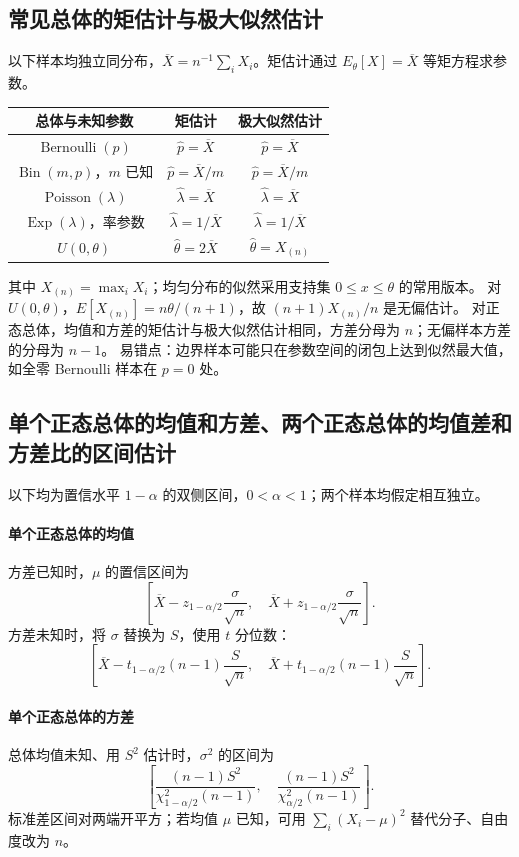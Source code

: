 \documentclass[../main.tex]{subfiles}
\begin{document}
\subsection{常见总体的矩估计与极大似然估计}
以下样本均独立同分布，$\overline X=n^{-1}\sum_iX_i$。矩估计通过 $E_\theta[X]=\overline X$ 等矩方程求参数。
\begin{center}
\begin{tabular}{c|c|c}
总体与未知参数 & 矩估计 & 极大似然估计\\\hline
$\operatorname{Bernoulli}(p)$ & $\widehat p=\overline X$ & $\widehat p=\overline X$\\
$\operatorname{Bin}(m,p)$，$m$ 已知 & $\widehat p=\overline X/m$ & $\widehat p=\overline X/m$\\
$\operatorname{Poisson}(\lambda)$ & $\widehat\lambda=\overline X$ & $\widehat\lambda=\overline X$\\
$\operatorname{Exp}(\lambda)$，率参数 & $\widehat\lambda=1/\overline X$ & $\widehat\lambda=1/\overline X$\\
$U(0,\theta)$ & $\widehat\theta=2\overline X$ & $\widehat\theta=X_{(n)}$
\end{tabular}
\end{center}
其中 $X_{(n)}=\max_iX_i$；均匀分布的似然采用支持集 $0\le x\le\theta$ 的常用版本。
对 $U(0,\theta)$，$E[X_{(n)}]=n\theta/(n+1)$，故 $(n+1)X_{(n)}/n$ 是无偏估计。
对正态总体，均值和方差的矩估计与极大似然估计相同，方差分母为 $n$；无偏样本方差的分母为 $n-1$。
易错点：边界样本可能只在参数空间的闭包上达到似然最大值，如全零 Bernoulli 样本在 $p=0$ 处。
\subsection{单个正态总体的均值和方差、两个正态总体的均值差和方差比的区间估计}
以下均为置信水平 $1-\alpha$ 的双侧区间，$0<\alpha<1$；两个样本均假定相互独立。

\paragraph{单个正态总体的均值}
方差已知时，$\mu$ 的置信区间为
\[
\left[\overline X-z_{1-\alpha/2}\frac\sigma{\sqrt n},\quad
\overline X+z_{1-\alpha/2}\frac\sigma{\sqrt n}\right].
\]
方差未知时，将 $\sigma$ 替换为 $S$，使用 $t$ 分位数：
\[
\left[\overline X-t_{1-\alpha/2}(n-1)\frac S{\sqrt n},\quad
\overline X+t_{1-\alpha/2}(n-1)\frac S{\sqrt n}\right].
\]
\paragraph{单个正态总体的方差}
总体均值未知、用 $S^2$ 估计时，$\sigma^2$ 的区间为
\[
\left[\frac{(n-1)S^2}{\chi^2_{1-\alpha/2}(n-1)},\quad
\frac{(n-1)S^2}{\chi^2_{\alpha/2}(n-1)}\right].
\]
标准差区间对两端开平方；若均值 $\mu$ 已知，可用 $\sum_i(X_i-\mu)^2$ 替代分子、自由度改为 $n$。
\end{document}

